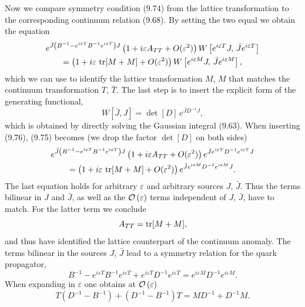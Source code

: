 Now we compare symmetry condition (9.74) from the lattice transformation to
the corresponding continuum relation (9.68). By setting the two equal we
obtain the equation
\begin{multline}
  e^{\bar J\left(B^{-1} - e^{i\varepsilon T}B^{-1}e^{i\varepsilon T}\right)J}
    \left(1 + i\varepsilon A_{TT} + O(\varepsilon^2)\right)
    W\left[e^{i\varepsilon T}J,\,\bar J e^{i\varepsilon T}\right] \\
  = \left(1 + i\varepsilon\,\operatorname{tr}[M + M] + O(\varepsilon^2)\right)
    W\left[e^{i\varepsilon M}J,\,\bar J e^{i\varepsilon M}\right] ,
\end{multline}
which we can use to identify the lattice transformation $M$, $M$ that matches
the continuum transformation $T$, $\bar T$. The last step is to insert the
explicit form of the generating functional,
\begin{equation}
  W[\bar J,J] = \det[D]\,e^{\bar J D^{-1}J} ,
\end{equation}
which is obtained by directly solving the Gaussian integral (9.63). When
inserting (9.76), (9.75) becomes (we drop the factor $\det[D]$ on both sides)
\begin{multline}
  e^{\bar J\left(B^{-1} - e^{i\varepsilon T}B^{-1}e^{i\varepsilon T}\right)J}
    \left(1 + i\varepsilon A_{TT} + O(\varepsilon^2)\right)
    e^{\bar J e^{i\varepsilon T}D^{-1}e^{i\varepsilon T}J} \\
  = \left(1 + i\varepsilon\,\operatorname{tr}[M + M] + O(\varepsilon^2)\right)
    e^{\bar J e^{i\varepsilon M}D^{-1}e^{i\varepsilon M}J} .
\end{multline}
The last equation holds for arbitrary $\varepsilon$ and arbitrary sources $J$,
$\bar J$. Thus the terms bilinear in $J$ and $\bar J$, as well as the
$\mathcal{O}\left(\varepsilon\right)$ terms independent of $J$, $\bar J$, have to match. For
the latter term we conclude
\begin{equation}
  A_{TT} = \operatorname{tr}[M + M] ,
\end{equation}
and thus have identified the lattice counterpart of the continuum anomaly. The
terms bilinear in the sources $J$, $\bar J$ lead to a symmetry relation for the
quark propagator,
\begin{equation}
  B^{-1} - e^{i\varepsilon T}B^{-1}e^{i\varepsilon T} + e^{i\varepsilon T}D^{-1}e^{i\varepsilon T}
  = e^{i\varepsilon M}D^{-1}e^{i\varepsilon M} .
\end{equation}
When expanding in $\varepsilon$ one obtains at $\mathcal{O}\left(\varepsilon\right)$
\begin{equation}
  T\left(D^{-1} - B^{-1}\right) + \left(D^{-1} - B^{-1}\right)T
  = M D^{-1} + D^{-1}M .
\end{equation}
